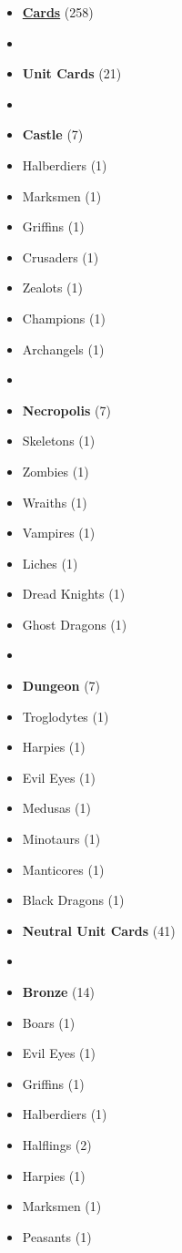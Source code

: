 \begin{multicols*}{3}
\begin{itemize}[leftmargin=0pt, label={}, noitemsep]
  \item \textbf{\small{\underline{Cards}}} (258)
  \item
  \item \textbf{Unit Cards} (21)
  \item
  \item \textbf{Castle} (7)
  \item Halberdiers (1)
  \item Marksmen (1)
  \item Griffins (1)
  \item Crusaders (1)
  \item Zealots (1)
  \item Champions (1)
  \item Archangels (1)
  \item
  \item \textbf{Necropolis} (7)
  \item Skeletons (1)
  \item Zombies (1)
  \item Wraiths (1)
  \item Vampires (1)
  \item Liches (1)
  \item Dread Knights (1)
  \item Ghost Dragons (1)
  \item
  \item \textbf{Dungeon} (7)
  \item Troglodytes (1)
  \item Harpies (1)
  \item Evil Eyes (1)
  \item Medusas (1)
  \item Minotaurs (1)
  \item Manticores (1)
  \item Black Dragons (1)
\columnbreak
  \item \textbf{Neutral Unit Cards} (41)
  \item
  \item \textbf{Bronze} (14)
  \item Boars (1)
  \item Evil Eyes (1)
  \item Griffins (1)
  \item Halberdiers (1)
  \item Halflings (2)
  \item Harpies (1)
  \item Marksmen (1)
  \item Peasants (1)

\end{itemize}
\end{multicols*}
